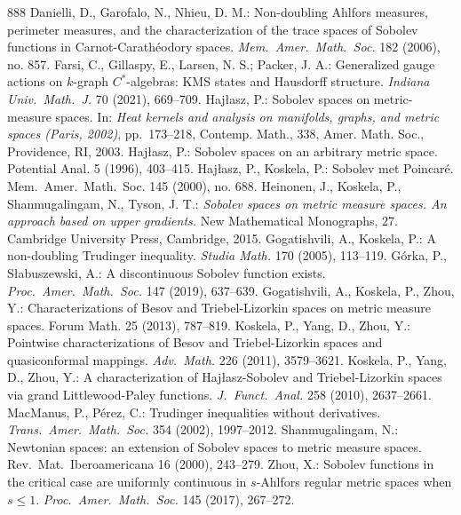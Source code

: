 \documentclass[12pt,leqno]{amsart}
\theoremstyle{definition}
\numberwithin{theorem}{section} \numberwithin{equation}{section}
\begin{document}
\begin{thebibliography}{888}
%
{\sc Danielli, D., Garofalo, N., Nhieu, D. M.:} Non-doubling Ahlfors measures, perimeter measures, and the characterization of the trace spaces of Sobolev functions in Carnot-Carathéodory spaces. {\em Mem.\ Amer.\ Math.\ Soc.} 182 (2006), no. 857.
% 
{\sc Farsi, C., Gillaspy, E., Larsen, N. S.; Packer, J. A.:} 
Generalized gauge actions on $k$-graph $C^*$-algebras: KMS states and Hausdorff structure.  {\em Indiana Univ.\ Math.\ J.} 70 (2021), 669--709.
%
{\sc Haj\l{}asz, P.:}
Sobolev spaces on metric-measure spaces. In: {\em Heat kernels and analysis on manifolds, graphs, and metric spaces (Paris, 2002)}, 
pp.\ 173--218, 
Contemp. Math., 338, Amer. Math. Soc., Providence, RI, 2003. 
%
{\sc Haj\l{}asz, P.:}
Sobolev spaces on an arbitrary metric space. 
Potential Anal. 5 (1996), 403--415. 
%
{\sc  Haj\l{}asz, P., Koskela, P.:}
Sobolev met Poincar\'e. Mem.\ Amer.\ Math.\ Soc. 145 (2000), no. 688.
%
{\sc  Heinonen, J., Koskela, P., Shanmugalingam, N., Tyson, J. T.:} 
{\em Sobolev spaces on metric measure spaces. An approach based on upper gradients.} 
New Mathematical Monographs, 27. Cambridge University Press, Cambridge, 2015.
%
{\sc Gogatishvili, A., Koskela, P.:}
A non-doubling Trudinger inequality. {\em Studia Math.} 170 (2005), 113--119.
%
{\sc Górka, P., Słabuszewski, A.:} A discontinuous Sobolev function exists. 
{\em Proc.\ Amer.\ Math.\ Soc.} 147 (2019), 637--639. 
%
{\sc Gogatishvili, A., Koskela, P., Zhou, Y.:} Characterizations of Besov and Triebel-Lizorkin spaces on metric measure spaces. Forum Math. 25 (2013), 787--819.
%
{\sc Koskela, P., Yang, D., Zhou, Y.:}
Pointwise characterizations of Besov and Triebel-Lizorkin spaces and quasiconformal mappings. {\em Adv.\ Math.} 226 (2011), 3579--3621.
%
{\sc Koskela, P., Yang, D., Zhou, Y.:}
A characterization of Hajłasz-Sobolev and Triebel-Lizorkin spaces via grand Littlewood-Paley functions. {\em J.\ Funct.\ Anal.} 258 (2010), 2637--2661.
%
{\sc MacManus, P., Pérez, C.:} Trudinger inequalities without derivatives. {\em Trans.\ Amer.\ Math.\ Soc.} 354 (2002), 1997--2012.
%
{\sc  Shanmugalingam, N.:}
Newtonian spaces: an extension of Sobolev spaces to metric measure spaces. 
Rev.\ Mat.\ Iberoamericana 16 (2000), 243--279.
%
{\sc Zhou, X.:} Sobolev functions in the critical case are uniformly continuous in $s$-Ahlfors regular metric spaces when $s\leq 1$. {\em Proc.\ Amer.\ Math.\ Soc.} 145 (2017),  267--272.
%
\end{thebibliography}
\end{document}
